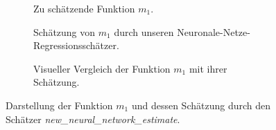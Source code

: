 {\begin{figure}
    \begin{subfigure}[b]{0.5\textwidth}
        \centering
        \scalebox{0.9}{
          }
        \caption{Zu schätzende Funktion $m_1$. \\\qquad  }
        \label{fig:subfig8}
    \end{subfigure}
    \begin{subfigure}[b]{0.5\textwidth}
    \centering
    \scalebox{0.9}{
           }
        \caption{Schätzung von $m_1$ durch unseren Neuronale-Netze-Regressionsschätzer.}   
        \label{fig:subfig9}
    \end{subfigure}
       \hspace{0.4cm}
    \begin{subfigure}[b]{1\textwidth}
    \centering
    \scalebox{0.9}{
	}
	 \caption{Visueller Vergleich der Funktion $m_1$ mit ihrer Schätzung.}
        \label{fig:subfig810}
    \end{subfigure}
    \caption{Darstellung der Funktion $m_1$ und dessen Schätzung durch den Schätzer \textit{new\_neural\_network\_estimate}.} 
\label{fig:subfig1.a.4}
\end{figure}


}
